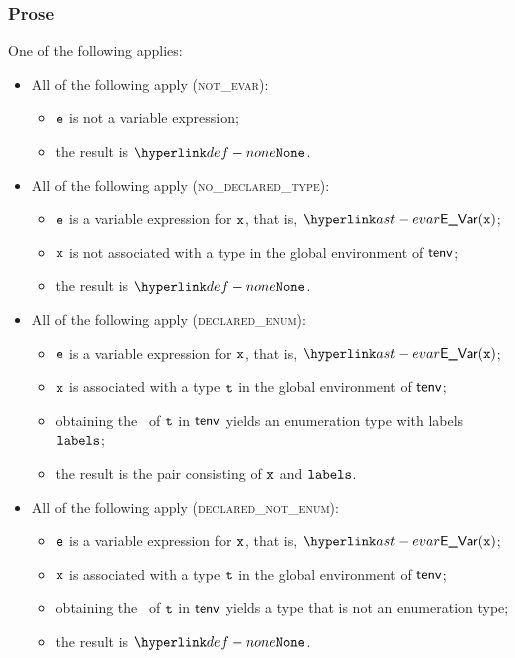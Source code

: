 \subsubsection{Prose}
One of the following applies:
\begin{itemize}
  \item All of the following apply (\textsc{not\_evar}):
  \begin{itemize}
    \item $\texttt{e}$ is not a variable expression;
    \item the result is $\None$.
  \end{itemize}

  \item All of the following apply (\textsc{no\_declared\_type}):
  \begin{itemize}
    \item $\texttt{e}$ is a variable expression for $\texttt{x}$, that is, $\EVar(\vx)$;
    \item $\texttt{x}$ is not associated with a type in the global environment of $\textsf{tenv}$;
    \item the result is $\None$.
  \end{itemize}

  \item All of the following apply (\textsc{declared\_enum}):
  \begin{itemize}
    \item $\texttt{e}$ is a variable expression for $\texttt{x}$, that is, $\EVar(\vx)$;
    \item $\texttt{x}$ is associated with a type $\texttt{t}$ in the global environment of $\textsf{tenv}$;
    \item obtaining the \underlyingtype\ of $\texttt{t}$ in $\textsf{tenv}$ yields an enumeration type with labels $\texttt{labels}$\ProseOrTypeError;
    \item the result is the pair consisting of $\texttt{x}$ and $\texttt{labels}$.
  \end{itemize}

  \item All of the following apply (\textsc{declared\_not\_enum}):
  \begin{itemize}
    \item $\texttt{e}$ is a variable expression for $\texttt{x}$, that is, $\EVar(\vx)$;
    \item $\texttt{x}$ is associated with a type $\texttt{t}$ in the global environment of $\textsf{tenv}$;
    \item obtaining the \underlyingtype\ of $\texttt{t}$ in $\textsf{tenv}$ yields a type that is not an enumeration type;
    \item the result is $\None$.
  \end{itemize}
\end{itemize}

